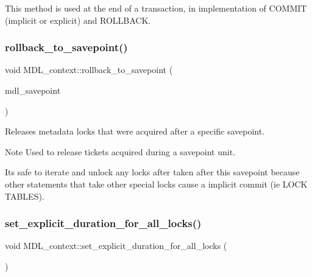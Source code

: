 This method is used at the end of a transaction, in implementation of C\+O\+M\+M\+IT (implicit or explicit) and R\+O\+L\+L\+B\+A\+CK. \mbox{\label{classMDL__context_a863ff94d0928e9720df30643835e4ef0}} 
\subsubsection{\texorpdfstring{rollback\+\_\+to\+\_\+savepoint()}{rollback\_to\_savepoint()}}
{\footnotesize\ttfamily void M\+D\+L\+\_\+context\+::rollback\+\_\+to\+\_\+savepoint (\begin{DoxyParamCaption}\item[{const \mbox{\hyperlink{classMDL__savepoint}{M\+D\+L\+\_\+savepoint}} \&}]{mdl\+\_\+savepoint }\end{DoxyParamCaption})}

Releases metadata locks that were acquired after a specific savepoint.

\begin{DoxyNote}{Note}
Used to release tickets acquired during a savepoint unit. 

It\textquotesingle{}s safe to iterate and unlock any locks after taken after this savepoint because other statements that take other special locks cause a implicit commit (ie L\+O\+CK T\+A\+B\+L\+ES). 
\end{DoxyNote}
\mbox{\label{classMDL__context_a357599f5af7c6ec7587ecb7b349f0313}} 
\subsubsection{\texorpdfstring{set\+\_\+explicit\+\_\+duration\+\_\+for\+\_\+all\+\_\+locks()}{set\_explicit\_duration\_for\_all\_locks()}}
{\footnotesize\ttfamily void M\+D\+L\+\_\+context\+::set\+\_\+explicit\+\_\+duration\+\_\+for\+\_\+all\+\_\+locks (\begin{DoxyParamCaption}{ }\end{DoxyParamCaption})}

